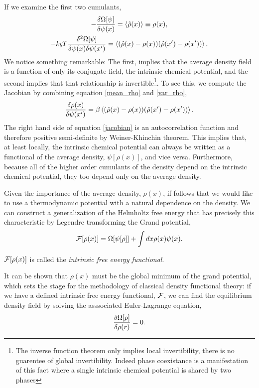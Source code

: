 If we examine the first two cumulants,
%
\begin{gather}
    \label{mean_rho}
    - \frac{\delta \Omega[\psi]}{\delta \psi(x)}
        = \left\langle \hat{\rho}(x) \right\rangle \equiv \rho(x), \\
    \label{var_rho} 
    -k_b T\frac{\delta^2 \Omega[\psi]}{\delta \psi(x) \delta \psi(x^\prime)}
        = \left\langle (\hat{\rho}(x) - \rho(x))
          (\hat{\rho}(x^\prime) - \rho(x^\prime)) \right\rangle,
\end{gather}
%
We notice something remarkable: The first, implies that the average density field is a function of only its conjugate
field, the intrinsic chemical potential, and the second implies that that
relationship is invertible\footnote{The inverse function theorem only implies
local invertibility, there is no guarentee of global invertibility. Indeed
phase coexistance is a manifestation of this fact where a single intrinsic
chemical potential is shared by two phases}.  To see this, we compute the 
Jacobian by combining equation \ref{mean_rho} and \ref{var_rho},
%
\begin{equation}
    \label{jacobian}
    \frac{\delta \rho(x)}{\delta \psi(x^\prime)} 
        = \beta \left\langle (\hat{\rho}(x) - \rho(x))
        (\hat{\rho}(x^\prime) - \rho(x^\prime)) \right\rangle.
\end{equation}
%
The right hand side of equation \ref{jacobian} is an autocorrelation function
and therefore positive semi-definite by Weiner-Khinchin theorem. This implies that, 
at least locally, the intrinsic chemical potential can always be written as a functional
of the average density, $\psi[\rho(x)]$, and vice versa. Furthermore, because
all of the higher order cumulants of the density depend on the intrinsic chemical
potential, they too depend only on the average density.

Given the importance of the average density, $\rho(x)$, if follows that we would
like to use a thermodynamic potential with a natural dependence on the density. We can
construct a generalization of the Helmholtz free energy that has precisely this 
characteristic by Legendre transforming the Grand potential,
%
\begin{equation}
    \mathcal{F}[\rho(x)] = \Omega[\psi[\rho]] + \int dx \rho(x) \psi(x).
\end{equation}
%

$\mathcal{F}[\rho(x)]$ is called the \textit{intrinsic free energy functional}.

It can be shown \cite{HansenAppendixB} that $\rho(x)$ must be the global
minimum of the grand potential, which sets the stage for the methodology of
classical density functional theory: if we have a defined intrinsic free energy
functional, $\mathcal{F}$, we can find the equilibrium density field by solving the
asssociated Euler-Lagrange equation, 
%
\begin{equation}
    \frac{\delta \Omega[\rho]}{\delta \rho(r)} = 0.
\end{equation}

